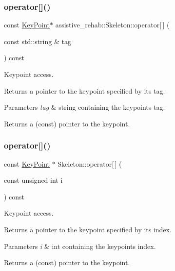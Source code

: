 \subsubsection{\texorpdfstring{operator[]()}{operator[]()}\hspace{0.1cm}{\footnotesize\ttfamily [1/2]}}
{\footnotesize\ttfamily const \mbox{\hyperlink{classassistive__rehab_1_1KeyPoint}{Key\+Point}}$\ast$ assistive\+\_\+rehab\+::\+Skeleton\+::operator\mbox{[}$\,$\mbox{]} (\begin{DoxyParamCaption}\item[{const std\+::string \&}]{tag }\end{DoxyParamCaption}) const}



Keypoint access. 

Returns a pointer to the keypoint specified by its tag. 
\begin{DoxyParams}{Parameters}
{\em tag} & string containing the keypoint\textquotesingle{}s tag. \\
\hline
\end{DoxyParams}
\begin{DoxyReturn}{Returns}
a (const) pointer to the keypoint. 
\end{DoxyReturn}
\mbox{\label{classassistive__rehab_1_1Skeleton_a0692ab89f16b0914b9ca9e0d4a07e52c}} 
\subsubsection{\texorpdfstring{operator[]()}{operator[]()}\hspace{0.1cm}{\footnotesize\ttfamily [2/2]}}
{\footnotesize\ttfamily const \mbox{\hyperlink{classassistive__rehab_1_1KeyPoint}{Key\+Point}} $\ast$ Skeleton\+::operator\mbox{[}$\,$\mbox{]} (\begin{DoxyParamCaption}\item[{const unsigned int}]{i }\end{DoxyParamCaption}) const}



Keypoint access. 

Returns a pointer to the keypoint specified by its index. 
\begin{DoxyParams}{Parameters}
{\em i} & int containing the keypoint\textquotesingle{}s index. \\
\hline
\end{DoxyParams}
\begin{DoxyReturn}{Returns}
a (const) pointer to the keypoint. 
\end{DoxyReturn}


